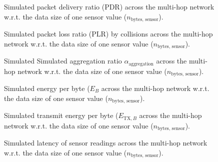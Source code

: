 \documentclass{article}
\newcommand{\multihop}{multi-hop\xspace}
\begin{document}
\FloatBarrier
\begin{figure}[p]
    \centering
    
    \vspace{-0.7cm}
    \caption{Simulated packet delivery ratio (PDR) across the \multihop network w.r.t. the data size of one sensor value ($n_\text{bytes, sensor}$).}
    \label{fig:}
\end{figure}
\begin{figure}[p]
    \centering
    
    \vspace{-0.7cm}
    \caption{Simulated packet loss ratio (PLR) by collisions across the \multihop network w.r.t. the data size of one sensor value ($n_\text{bytes, sensor}$).}
    \label{fig:}
\end{figure}
\begin{figure}[p]
    \centering
    
    \vspace{-0.7cm}
    \caption{Simulated Simulated aggregation ratio $\alpha_\text{aggregation}$ across the \multihop network w.r.t. the data size of one sensor value ($n_\text{bytes, sensor}$).}
    \label{fig:}
\end{figure}
\begin{figure}[p]
    \centering
    
    \vspace{-0.7cm}
    \caption{Simulated energy per byte ($E_B$ across the \multihop network w.r.t. the data size of one sensor value ($n_\text{bytes, sensor}$).}
    \label{fig:}
\end{figure}
\begin{figure}[p]
    \centering
    
    \vspace{-0.7cm}
    \caption{Simulated transmit energy per byte ($E_{\text{TX}, B}$ across the \multihop network w.r.t. the data size of one sensor value ($n_\text{bytes, sensor}$).}
    \label{fig:}
\end{figure}
\begin{figure}[p]
    \centering
    
    \vspace{-0.7cm}
    \caption{Simulated latency of sensor readings across the \multihop network w.r.t. the data size of one sensor value ($n_\text{bytes, sensor}$).}
    \label{fig:}
\end{figure}
\end{document}
